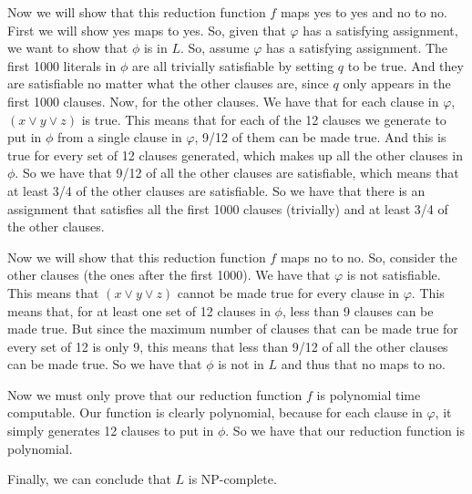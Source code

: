 \documentclass{article}
\begin{document}
\begin{description}
        Now we will show that this reduction function $f$ maps yes to yes and no
        to no. First we will show yes maps to yes. So, given that $\varphi$
        has a satisfying assignment, we want to show that $\phi$ is in $L$.
        So, assume $\varphi$ has a satisfying assignment. The first 1000
        literals in $\phi$ are all trivially satisfiable by setting $q$ to be
        true. And they are satisfiable no matter what the other clauses are,
        since $q$ only appears in the first 1000 clauses. Now, for the other
        clauses. We have that for each clause in $\varphi$, $(x \vee y \vee z)$
        is true. This means that for each of the 12 clauses we generate to put
        in $\phi$ from a single clause in $\varphi$, 9/12 of them can be made
        true. And this is true for every set of 12 clauses generated, which makes up all
        the other clauses in $\phi$. So we have that 9/12 of all the other
        clauses are satisfiable, which means that at least 3/4 of the other
        clauses are satisfiable. So we have that there is an assignment that
        satisfies all the first 1000 clauses (trivially) and at least 3/4 of the
        other clauses.

        Now we will show that this reduction function $f$ maps no to no. So,
        consider the other clauses (the ones after the first 1000). We have that
        $\varphi$ is not satisfiable. This means that $(x \vee y \vee z)$
        cannot be made true for every clause in $\varphi$. This means that, for
        at least one set of 12 clauses in $\phi$, less than 9 clauses can be
        made true. But since the maximum number of clauses that can be made true
        for every set of 12 is only 9, this means that less than 9/12 of all the
        other clauses can be made true. So we have that $\phi$ is not in $L$ and
        thus that no maps to no.

        Now we must only prove that our reduction function $f$ is polynomial time
        computable. Our function is clearly polynomial, because for each clause
        in $\varphi$, it simply generates 12 clauses to put in $\phi$. So we have
        that our reduction function is polynomial.

        Finally, we can conclude that $L$ is NP-complete.
\end{description}
\newpage
\end{document}
